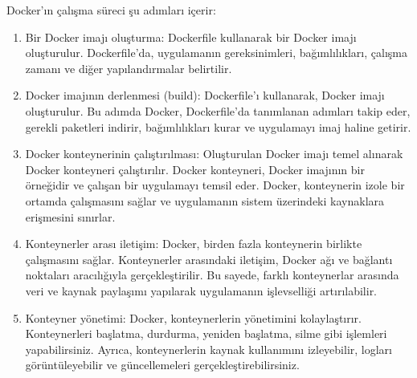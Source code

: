 Docker'ın çalışma süreci  şu adımları içerir:
\begin{enumerate}
\item Bir Docker imajı oluşturma: Dockerfile kullanarak bir Docker imajı oluşturulur. Dockerfile'da, uygulamanın gereksinimleri, bağımlılıkları, çalışma zamanı ve diğer yapılandırmalar belirtilir.

\item Docker imajının derlenmesi (build): Dockerfile'ı kullanarak, Docker imajı oluşturulur. Bu adımda Docker, Dockerfile'da tanımlanan adımları takip eder, gerekli paketleri indirir, bağımlılıkları kurar ve uygulamayı imaj haline getirir.

\item Docker konteynerinin çalıştırılması: Oluşturulan Docker imajı temel alınarak Docker konteyneri çalıştırılır. Docker konteyneri, Docker imajının bir örneğidir ve çalışan bir uygulamayı temsil eder. Docker, konteynerin izole bir ortamda çalışmasını sağlar ve uygulamanın sistem üzerindeki kaynaklara erişmesini sınırlar.

\item Konteynerler arası iletişim: Docker, birden fazla konteynerin birlikte çalışmasını sağlar. Konteynerler arasındaki iletişim, Docker ağı ve bağlantı noktaları aracılığıyla gerçekleştirilir. Bu sayede, farklı konteynerlar arasında veri ve kaynak paylaşımı yapılarak uygulamanın işlevselliği artırılabilir.

\item Konteyner yönetimi: Docker, konteynerlerin yönetimini kolaylaştırır. Konteynerleri başlatma, durdurma, yeniden başlatma, silme gibi işlemleri yapabilirsiniz. Ayrıca, konteynerlerin kaynak kullanımını izleyebilir, logları görüntüleyebilir ve güncellemeleri gerçekleştirebilirsiniz.
\end{enumerate}


